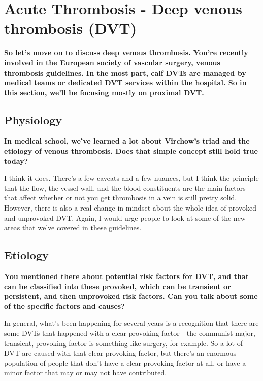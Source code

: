 \documentclass[
]{book}
\begin{document}
\hypertarget{acute-thrombosis---deep-venous-thrombosis-dvt}{%
\section{Acute Thrombosis - Deep venous thrombosis (DVT)}\label{acute-thrombosis---deep-venous-thrombosis-dvt}}

\textbf{So let's move on to discuss deep venous thrombosis. You're recently
involved in the European society of vascular surgery, venous thrombosis
guidelines. In the most part, calf DVTs are managed by medical teams or
dedicated DVT services within the hospital. So in this section, we'll be
focusing mostly on proximal DVT.}

\hypertarget{physiology}{%
\subsection{Physiology}\label{physiology}}

\textbf{In medical school, we've learned a lot about Virchow's triad and the
etiology of venous thrombosis. Does that simple concept still hold true
today?}

I think it does. There's a few caveats and a few nuances, but I think
the principle that the flow, the vessel wall, and the blood constituents
are the main factors that affect whether or not you get thrombosis in a
vein is still pretty solid. However, there is also a real change in
mindset about the whole idea of provoked and unprovoked DVT. Again, I
would urge people to look at some of the new areas that we've covered in
these guidelines.

\hypertarget{etiology-10}{%
\subsection{Etiology}\label{etiology-10}}

\textbf{You mentioned there about potential risk factors for DVT, and that can
be classified into these provoked, which can be transient or persistent,
and then unprovoked risk factors. Can you talk about some of the
specific factors and causes?}

In general, what's been happening for several years is a recognition
that there are some DVTs that happened with a clear provoking
factor---the communist major, transient, provoking factor is something
like surgery, for example. So a lot of DVT are caused with that clear
provoking factor, but there's an enormous population of people that
don't have a clear provoking factor at all, or have a minor factor that
may or may not have contributed.
\end{document}
